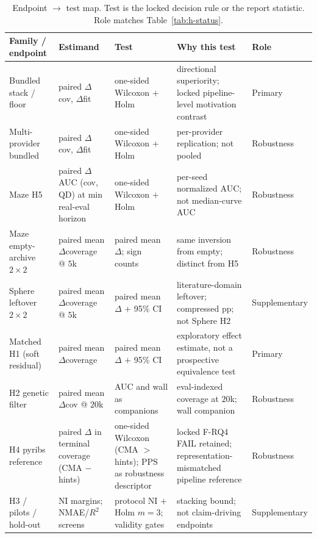 \documentclass[preprint,12pt]{elsarticle}
\begin{document}
\begin{table}[!htbp]
  \centering
  \caption{Endpoint $\rightarrow$ test map. Test is the locked decision rule or the report statistic. Role matches Table~\ref{tab:h-status}.}
  \label{tab:test-map}
  \scriptsize
  \setlength{\tabcolsep}{3.5pt}
  \begin{tabularx}{\linewidth}{@{}>{\raggedright\arraybackslash}p{2.15cm}>{\raggedright\arraybackslash}p{2.45cm}>{\raggedright\arraybackslash}p{2.45cm}>{\raggedright\arraybackslash}X>{\raggedright\arraybackslash}p{1.85cm}@{}}
    \toprule
    Family / endpoint & Estimand & Test & Why this test & Role \\
    \midrule
    Bundled stack / floor & paired $\Delta$cov, $\Delta$fit & one-sided Wilcoxon $+$ Holm & directional superiority; locked pipeline-level motivation contrast & Primary \\
    Multi-provider bundled & paired $\Delta$cov, $\Delta$fit & one-sided Wilcoxon $+$ Holm & per-provider replication; not pooled & Robustness \\
    Maze H5 & paired $\Delta$AUC (cov, QD) at min real-eval horizon & one-sided Wilcoxon $+$ Holm & per-seed normalized AUC; not median-curve AUC & Robustness \\
    Maze empty-archive $2\times2$ & paired mean $\Delta$coverage @ $5$k & paired mean $\Delta$; sign counts & same inversion from empty; distinct from H5 & Robustness \\
    Sphere leftover $2\times2$ & paired mean $\Delta$coverage @ $5$k & paired mean $\Delta$ $+$ 95\% CI & literature-domain leftover; compressed pp; not Sphere H2 & Supplementary \\
    Matched H1 (soft residual) & paired mean $\Delta$coverage & paired mean $\Delta$ $+$ 95\% CI & exploratory effect estimate, not a prospective equivalence test & Primary \\
    H2 genetic filter & paired mean $\Delta$cov @ $20$k & AUC and wall as companions & eval-indexed coverage at $20$k; wall companion & Robustness \\
    H4 pyribs reference & paired $\Delta$ in terminal coverage (CMA $-$ hints) & one-sided Wilcoxon (CMA $>$ hints); $\mathrm{PPS}$ as robustness descriptor & locked F-RQ4 FAIL retained; representation-mismatched pipeline reference & Robustness \\
    H3 / pilots / hold-out & NI margins; NMAE/$R^2$ screens & protocol NI $+$ Holm $m{=}3$; validity gates & stacking bound; not claim-driving endpoints & Supplementary \\

\end{tabularx}
\end{table}
\end{document}
